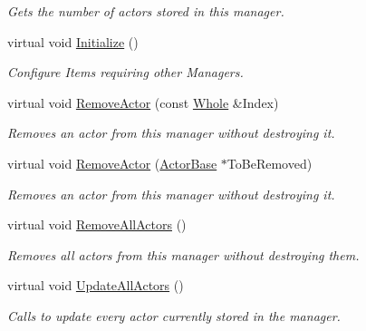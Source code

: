 \begin{DoxyCompactItemize}
\begin{DoxyCompactList}\small\item\em Gets the number of actors stored in this manager. \end{DoxyCompactList}\item 
virtual void \hyperlink{classMezzanine_1_1ActorManager_a3b5b383066473d09243d13ad702c4868}{Initialize} ()
\begin{DoxyCompactList}\small\item\em Configure Items requiring other Managers.  \end{DoxyCompactList}\item 
virtual void \hyperlink{classMezzanine_1_1ActorManager_ac74758ad6d5c03b20105d641f0e37de3}{Remove\-Actor} (const \hyperlink{namespaceMezzanine_adcbb6ce6d1eb4379d109e51171e2e493}{Whole} \&Index)
\begin{DoxyCompactList}\small\item\em Removes an actor from this manager without destroying it. \end{DoxyCompactList}\item 
virtual void \hyperlink{classMezzanine_1_1ActorManager_a5c28bea0eb64822ce94ce38762aedc1e}{Remove\-Actor} (\hyperlink{classMezzanine_1_1ActorBase}{Actor\-Base} $\ast$To\-Be\-Removed)
\begin{DoxyCompactList}\small\item\em Removes an actor from this manager without destroying it. \end{DoxyCompactList}\item 
\hypertarget{classMezzanine_1_1ActorManager_a6ca8342617fa221b0548ff9bc6bf4477}{virtual void \hyperlink{classMezzanine_1_1ActorManager_a6ca8342617fa221b0548ff9bc6bf4477}{Remove\-All\-Actors} ()}\label{classMezzanine_1_1ActorManager_a6ca8342617fa221b0548ff9bc6bf4477}

\begin{DoxyCompactList}\small\item\em Removes all actors from this manager without destroying them. \end{DoxyCompactList}\item 
\hypertarget{classMezzanine_1_1ActorManager_a09ae1e126a501cd932dbbc9290120b7d}{virtual void \hyperlink{classMezzanine_1_1ActorManager_a09ae1e126a501cd932dbbc9290120b7d}{Update\-All\-Actors} ()}\label{classMezzanine_1_1ActorManager_a09ae1e126a501cd932dbbc9290120b7d}

\begin{DoxyCompactList}\small\item\em Calls to update every actor currently stored in the manager. \end{DoxyCompactList}\end{DoxyCompactItemize}
